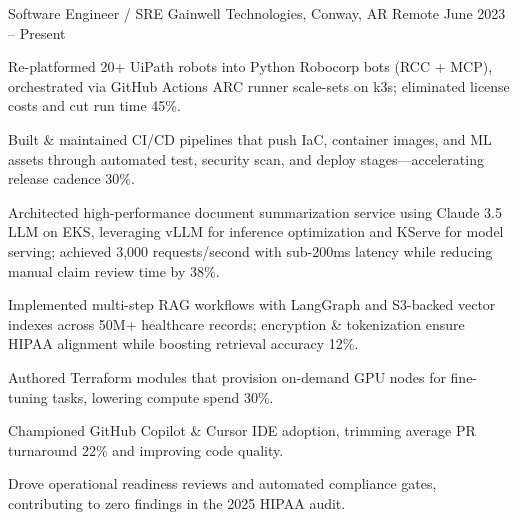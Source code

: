 


\begin{cventries}


\cventry
{Software Engineer / SRE} %
{Gainwell Technologies, Conway, AR} %
{Remote} %
{June 2023 -- Present} %
{ %
\begin{cvitems}
\item {Re-platformed 20+ UiPath robots into Python Robocorp bots (RCC + MCP), orchestrated via GitHub Actions ARC runner scale-sets on k3s; eliminated license costs and cut run time 45\%.}
\item {Built \& maintained CI/CD pipelines that push IaC, container images, and ML assets through automated test, security scan, and deploy stages---accelerating release cadence 30\%.}
\item {Architected high-performance document summarization service using Claude 3.5 LLM on EKS, leveraging vLLM for inference optimization and KServe for model serving; achieved 3,000 requests/second with sub-200ms latency while reducing manual claim review time by 38\%.}
\item {Implemented multi-step RAG workflows with LangGraph and S3-backed vector indexes across 50M+ healthcare records; encryption \& tokenization ensure HIPAA alignment while boosting retrieval accuracy 12\%.}
\item {Authored Terraform modules that provision on-demand GPU nodes for fine-tuning tasks, lowering compute spend 30\%.}
\item {Championed GitHub Copilot \& Cursor IDE adoption, trimming average PR turnaround 22\% and improving code quality.}
\item {Drove operational readiness reviews and automated compliance gates, contributing to zero findings in the 2025 HIPAA audit.}
\end{cvitems}
}





\end{cventries}
